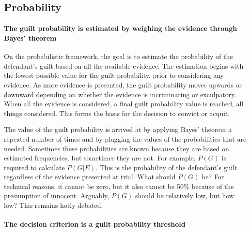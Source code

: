 \documentclass[10pt]{article}
\begin{document}
 
 




\subsection{Probability}


\paragraph{The guilt probability is estimated by weighing  the evidence through Bayes' theorem}

 On the probabilistic framework, the goal is to estimate the probability of the defendant's guilt based 
 on all the available evidence. The estimation begins with the lowest possible value 
for the guilt probability, prior to considering any evidence. As more evidence is presented, the guilt probability 
moves upwards or downward depending on whether the evidence is incriminating or exculpatory. 
When all the evidence is considered, a final guilt probability value is 
reached, all things considered. This forms the basis for 
the decision to convict or acquit. 

The value of the guilt probability is arrived at by applying Bayes' theorem a 
repeated number of times and by plugging the values of the probabilities that are needed. 
Sometimes these probabilities are known because they are based on estimated frequencies, but sometimes 
they are not. For example, $P(G)$ is required to calculate $P(G|E)$. 
This is the probability of the defendant's guilt regardless of the evidence 
presented at trial. What should $P(G)$ be?
For technical reasons, it cannot be zero, but it also cannot be 50\% because 
of the presumption of innocent. Arguably, $P(G)$ should be relatively low, but how low?
This remains  hotly debated. 


\paragraph{The decision criterion is a guilt probability threshold}
\end{document}
